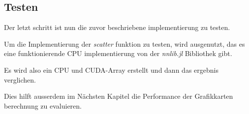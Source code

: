 \subsection{Testen}

Der letzt schritt ist nun die zuvor beschriebene implementierung zu testen.

Um die Implementierung der \textit{scatter} funktion zu testen, wird ausgenutzt,
das es eine funktionierende CPU implementierung von der \textit{nnlib.jl} Bibliothek gibt.

Es wird also ein CPU und CUDA-Array erstellt und dann das ergebnis verglichen.

Dies hilft ausserdem im Nächsten Kapitel die Performance der Grafikkarten berechnung zu evaluieren.

